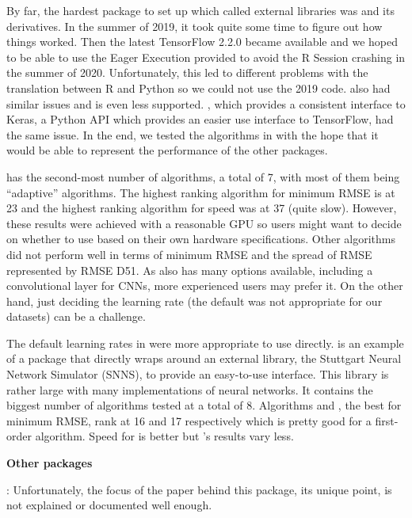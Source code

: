 By far, the hardest package to set up which called external libraries
was  \citep{R-tensorflow} and its derivatives. In
the summer of 2019, it took quite some time to figure out how things
worked. Then the latest TensorFlow 2.2.0 became available and we hoped
to be able to use the Eager Execution provided to avoid the R Session
crashing in the summer of 2020. Unfortunately, this led to different
problems with the translation between R and Python so we could not use
the 2019 code.  \citep{R-tfestimators} also had
similar issues and is even less supported. 
\citep{R-kerasR}, which provides a consistent interface to Keras, a
Python API which provides an easier use interface to TensorFlow, had the
same issue. In the end, we tested the algorithms in 
\citep{R-keras} with the hope that it would be able to represent the
performance of the other packages.

 has the second-most number of algorithms, a total of 7, with
most of them being ``adaptive'' algorithms. The highest ranking
algorithm for minimum RMSE is  at 23 and the highest
ranking algorithm for speed was  at 37 (quite slow).
However, these results were achieved with a reasonable GPU so users
might want to decide on whether to use  based on their own
hardware specifications. Other algorithms did not perform well in terms
of minimum RMSE and the spread of RMSE represented by RMSE D51. As
 also has many options available, including a convolutional
layer for CNNs, more experienced users may prefer it. On the other hand,
just deciding the learning rate (the default was not appropriate for our
datasets) can be a challenge.

The default learning rates in  \citep{R-RSNNS} were more
appropriate to use directly.  is an example of a package that
directly wraps around an external library, the Stuttgart Neural Network
Simulator (SNNS), to provide an easy-to-use interface. This library is
rather large with many implementations of neural networks. It contains
the biggest number of algorithms tested at a total of 8. Algorithms
 and , the best for minimum RMSE, rank at 16 and
17 respectively which is pretty good for a first-order algorithm. Speed
for  is better but 's results vary less.

\textbf{Other packages }

 \citep{R-AMORE}: Unfortunately, the focus of the paper
behind this package, its unique point, is not explained or documented
well enough.

